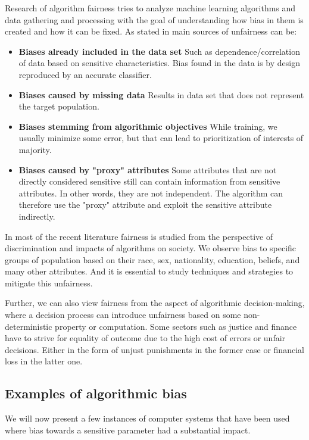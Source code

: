 Research of algorithm fairness tries to analyze machine learning algorithms and data gathering and processing with the goal of understanding how bias in them is created and how it can be fixed.
\newline
As stated in \cite{pessach2020algorithmic_fairness} main sources of unfairness can be:
\begin{itemize}
    \item \textbf{Biases already included in the data set}\newline
    Such as dependence/correlation of data based on sensitive characteristics. Bias found in the data is by design reproduced by an accurate classifier.
    \item \textbf{Biases caused by missing data}\newline
    Results in data set that does not represent the target population.
    \item \textbf{Biases stemming from algorithmic objectives}\newline
    While training, we usually minimize some error, but that can lead to prioritization of interests of majority.
    \item \textbf{Biases caused by "proxy" attributes}\newline
    Some attributes that are not directly considered sensitive still can contain information from sensitive attributes. In other words, they are not independent. The algorithm can therefore use the "proxy" attribute and exploit the sensitive attribute indirectly.
\end{itemize}


In most of the recent literature fairness is studied from the perspective of discrimination and impacts of algorithms on society. We observe bias to specific groups of population based on their race, sex, nationality, education, beliefs, and many other attributes. And it is essential to study techniques and strategies to mitigate this unfairness.

Further, we can also view fairness from the aspect of algorithmic decision-making, where a decision process can introduce unfairness based on some non-deterministic property or computation. Some sectors such as justice and finance have to strive for equality of outcome due to the high cost of errors or unfair decisions. Either in the form of unjust punishments in the former case or financial loss in the latter one.


\subsection{Examples of algorithmic bias}\label{subsec:02_algo_fairness.examples_of_algo_biass}
We will now present a few instances of computer systems that have been used where bias towards a sensitive parameter had a substantial impact.

